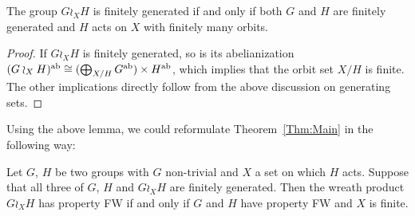 %
%
\begin{lem}
The group $G\wr_XH$ is finitely generated if and only if both $G$ and $H$ are finitely generated and $H$ acts on $X$ with finitely many orbits.
\end{lem}
\begin{proof}
If $G\wr_XH$ is finitely generated, so is its abelianization $(G\wr_XH)^{\operatorname{ab}}\cong (\bigoplus_{X/H}G^{\operatorname{ab}})\times H^{\operatorname{ab}}$, which implies that the orbit set $X/H$ is finite. The other implications directly follow from the above discussion on generating sets.
\end{proof}
%
%
Using the above lemma, we could reformulate Theorem~\ref{Thm:Main} in the following way:
%
%
\begin{prop}
Let $G$, $H$ be two groups with $G$ non-trivial and $X$ a set on which $H$ acts. Suppose that all three of $G$, $H$ and $G\wr_XH$ are finitely generated. Then the wreath product $G\wr_XH$ has property FW if and only if $G$ and $H$ have property FW and $X$ is finite.
\end{prop}
